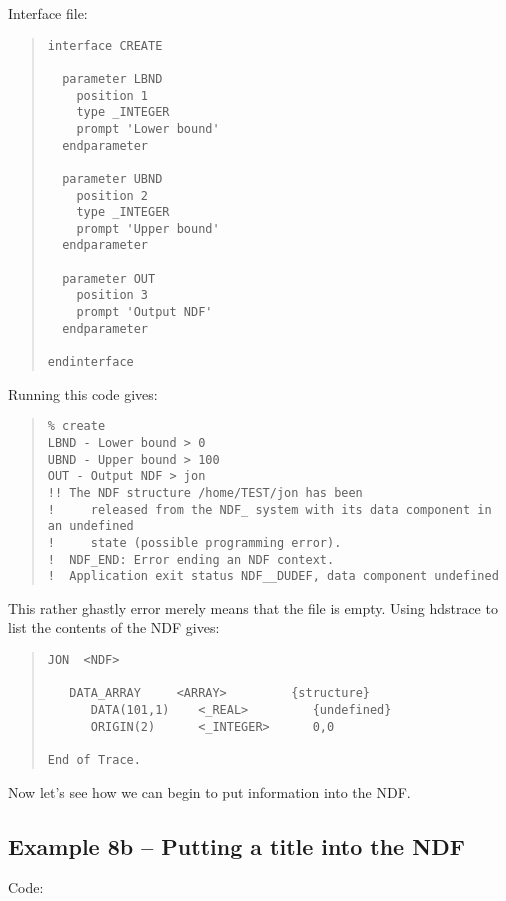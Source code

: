Interface file:

\begin{quote}
{\small
\begin{verbatim}
interface CREATE

  parameter LBND
    position 1
    type _INTEGER
    prompt 'Lower bound'
  endparameter

  parameter UBND
    position 2
    type _INTEGER
    prompt 'Upper bound'
  endparameter

  parameter OUT
    position 3
    prompt 'Output NDF'
  endparameter

endinterface
\end{verbatim}
}
\end{quote}

Running this code gives:

\begin{quote}
{\small
\begin{verbatim}
% create
LBND - Lower bound > 0 
UBND - Upper bound > 100
OUT - Output NDF > jon
!! The NDF structure /home/TEST/jon has been
!     released from the NDF_ system with its data component in an undefined
!     state (possible programming error).
!  NDF_END: Error ending an NDF context.
!  Application exit status NDF__DUDEF, data component undefined    
\end{verbatim}
}
\end{quote}

This rather ghastly error merely means that the file is empty. Using {\sf
hdstrace} to list the contents of the NDF gives: 

\begin{quote}
{\small
\begin{verbatim}
JON  <NDF>
 
   DATA_ARRAY     <ARRAY>         {structure}
      DATA(101,1)    <_REAL>         {undefined}
      ORIGIN(2)      <_INTEGER>      0,0
 
End of Trace.
\end{verbatim}
}
\end{quote}

Now let's see how we can begin to put information into the NDF. 

\subsection{Example 8b -- Putting a title into the NDF}

Code:

